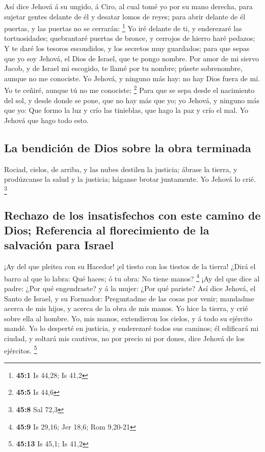  Así dice Jehová á su ungido, á Ciro, al cual tomé yo por
su mano derecha, para sujetar gentes delante de él y desatar lomos de
reyes; para abrir delante de él puertas, y las puertas no se cerrarán:
\footnote{\textbf{45:1} Is 44,28; Is 41,2}  Yo iré delante
de ti, y enderezaré las tortuosidades; quebrantaré puertas de bronce, y
cerrojos de hierro haré pedazos;  Y te daré los tesoros
escondidos, y los secretos muy guardados; para que sepas que yo soy
Jehová, el Dios de Israel, que te pongo nombre.  Por amor
de mi siervo Jacob, y de Israel mi escogido, te llamé por tu nombre;
púsete sobrenombre, aunque no me conociste.  Yo Jehová, y
ninguno más hay: no hay Dios fuera de mí. Yo te ceñiré, aunque tú no me
conociste; \footnote{\textbf{45:5} Is 44,6}  Para que se
sepa desde el nacimiento del sol, y desde donde se pone, que no hay más
que yo; yo Jehová, y ninguno más que yo:  Que formo la luz
y crío las tinieblas, que hago la paz y crío el mal. Yo Jehová que hago
todo esto.

\hypertarget{la-bendiciuxf3n-de-dios-sobre-la-obra-terminada}{%
\subsection{La bendición de Dios sobre la obra
terminada}\label{la-bendiciuxf3n-de-dios-sobre-la-obra-terminada}}

 Rociad, cielos, de arriba, y las nubes destilen la
justicia; ábrase la tierra, y prodúzcanse la salud y la justicia;
háganse brotar juntamente. Yo Jehová lo crié. \footnote{\textbf{45:8}
  Sal 72,3}

\hypertarget{rechazo-de-los-insatisfechos-con-este-camino-de-dios-referencia-al-florecimiento-de-la-salvaciuxf3n-para-israel}{%
\subsection{Rechazo de los insatisfechos con este camino de Dios;
Referencia al florecimiento de la salvación para
Israel}\label{rechazo-de-los-insatisfechos-con-este-camino-de-dios-referencia-al-florecimiento-de-la-salvaciuxf3n-para-israel}}

 ¡Ay del que pleitea con su Hacedor! ¡el tiesto con los
tiestos de la tierra! ¿Dirá el barro al que lo labra: Qué haces; ó tu
obra: No tiene manos? \footnote{\textbf{45:9} Is 29,16; Jer 18,6; Rom
  9,20-21}  ¡Ay del que dice al padre: ¿Por qué
engendraste? y á la mujer: ¿Por qué pariste?  Así dice
Jehová, el Santo de Israel, y su Formador: Preguntadme de las cosas por
venir; mandadme acerca de mis hijos, y acerca de la obra de mis manos.
 Yo hice la tierra, y crié sobre ella al hombre. Yo, mis
manos, extendieron los cielos, y á todo su ejército mandé.
 Yo lo desperté en justicia, y enderezaré todos sus
caminos; él edificará mi ciudad, y soltará mis cautivos, no por precio
ni por dones, dice Jehová de los ejércitos. \footnote{\textbf{45:13} Is
  45,1; Is 41,2}

